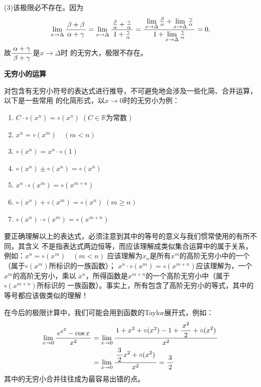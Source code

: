 (3)该极限必不存在。因为
\begin{align*}
	\lim\limits_{x\to{\Delta}}\displaystyle\frac{\,{\beta+\beta}\,}{\,{\alpha+\gamma}\,}
	=\lim\limits_{x\to{\Delta}}\displaystyle\frac{\,{\frac{\beta}{\alpha}+\frac{\gamma}{\alpha}}\,}{\,{1+\frac{\gamma}{\alpha}}\,}
	=\displaystyle\frac{\,{\lim\limits_{x\to{\Delta}}\frac{\beta}{\alpha}
	+\lim\limits_{x\to{\Delta}}\frac{\gamma}{\alpha}}\,}{\,{1+\lim\limits_{x\to{\Delta}}\frac{\gamma}{\alpha}}\,}
	=0,
\end{align*}
故$\displaystyle\frac{\,{\alpha+\gamma}\,}{\,{\beta+\gamma}\,}$是$x\to\Delta$时
的无穷大，极限不存在。
\fin

\begin{shaded}
	{\bf 无穷小的运算}
	
	对包含有无穷小符号的表达式进行推导，不可避免地会涉及一些化简、合并运算，以下是一些常用
	的化简形式，以$x\to 0$时的无穷小为例：
	\begin{tcolorbox}
		\begin{enumerate}[(1)]
	  	  \item $C\cdot\circ(x^n)=\circ(x^n)\;(C\in\mathbb{R}\mbox{为常数})$
		  \item $x^n=\circ(x^m)\quad (m<n)$ 
		  \item $\circ(x^n)=x^n\cdot\circ(1)$
		  \item $\circ(x^n)\pm\circ(x^n)=\circ(x^n)$
		  \item $x^n\cdot\circ(x^m)=\circ(x^{m+n})$ 
		  \item $\circ(x^n)+\circ(x^m)=\circ(x^n)\;(m\geq n)$  
		  \item $\circ(x^n)\cdot\circ(x^m)=\circ(x^{m+n})$
		\end{enumerate}
	\end{tcolorbox}
	要正确理解以上的表达式，必须注意到其中的等号的意义与我们惯常使用的有所不同，其含义
	不是指表达式两边恒等，而应该理解成类似集合运算中的属于关系，例如：$x^n=\circ(x^m)\quad (m<n)$ 
	应该理解为$x_n$是所有$x^m$的高阶无穷小中的一个（属于$\circ(x^m)$所标识的一族函数）；
	$x^n\cdot\circ(x^m)=\circ(x^{m+n})$应该理解为，一个$x^m$的高阶无穷小，乘以
	$x^n$，所得函数是$x^{m+n}$的一个高阶无穷小中（属于$\circ(x^{m+n})$所标识的
	一族函数）。事实上，所有包含了高阶无穷小的等式，其中的等号都应该做类似的理解！
	
	在今后的极限计算中，我们可能会用到函数的Taylor展开式，例如：
	\begin{align}
		\lim\limits_{x\to{0}}\displaystyle\frac{\,{e^{x^2}-\cos x}\,}{\,{x^2}\,}&=\lim\limits_{x\to{0}}
		\displaystyle\frac{\,{1+x^2+\circ(x^2)-1+\displaystyle\frac{\,{x^2}\,}{\,{2}\,}+\circ(x^2)}\,}{\,{x^2}\,}\notag\\
		&=\lim\limits_{x\to{0}}\displaystyle\frac{\,{\displaystyle\frac{\,{3}\,}{\,{2}\,}x^2+\circ(x^2)}\,}{\,{x^2}\,}=\displaystyle\frac{\,{3}\,}{\,{2}\,}\notag
	\end{align}
	其中的无穷小合并往往成为最容易出错的点。
\end{shaded}

